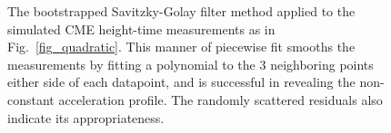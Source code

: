\documentclass[structabstract]{aa}
\begin{document}
\begin{figure}[t]
\centering
{}
\caption{The bootstrapped Savitzky-Golay filter method applied to the simulated CME height-time measurements as in Fig.~\ref{fig_quadratic}. This manner of piecewise fit smooths the measurements by fitting a polynomial to the 3 neighboring points either side of each datapoint, and is successful in revealing the non-constant acceleration profile. The randomly scattered residuals also indicate its appropriateness.}
\label{fig_savgol}
\end{figure}
\end{document}
